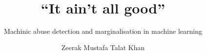 \title{``It ain't all good''}

\subtitle{Machinic abuse detection and marginalisation in machine learning}

\author{Zeerak Mustafa Talat Khan}







     
